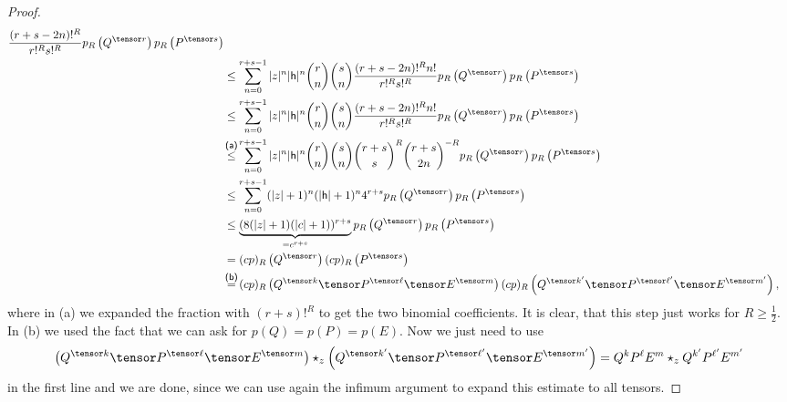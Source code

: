\begin{proof}
\begin{align*}
        \frac{(r + s - 2n)!^R}{r!^R s!^R}
        p_R \left(Q^{\tensor r} \right)
        p_R \left(P^{\tensor s} \right)
        \\
        & \leq
        \sum\limits_{n=0}^{r + s - 1}
        |z|^n |\mathsf{h}|^n
        \binom{r}{n} \binom{s}{n}
        \frac{(r + s - 2n)!^R n!}{r!^R s!^R}
        p_R \left(Q^{\tensor r} \right)
        p_R \left(P^{\tensor s} \right)
        \\
        & \leq
        \sum\limits_{n=0}^{r + s - 1}
        |z|^n |\mathsf{h}|^n
        \binom{r}{n} \binom{s}{n}
        \frac{(r + s - 2n)!^R n!}{r!^R s!^R}
        p_R \left(Q^{\tensor r} \right)
        p_R \left(P^{\tensor s} \right)
        \\
        & \ot{(a)}{\leq}
        \sum\limits_{n=0}^{r + s - 1}
        |z|^n |\mathsf{h}|^n
        \binom{r}{n} \binom{s}{n}
        \binom{r + s}{s}^R
        \binom{r + s}{2n}^{-R}
        p_R \left(Q^{\tensor r} \right)
        p_R \left(P^{\tensor s} \right)
        \\
        & \leq
        \sum\limits_{n=0}^{r + s - 1}
        (|z| + 1)^n (|\mathsf{h}| + 1)^n
        4^{r + s}
        p_R \left(Q^{\tensor r} \right)
        p_R \left(P^{\tensor s} \right)
        \\
        & \leq
        \underbrace{
        (8 (|z| + 1) (|c| + 1))^{r + s}
        }_{ = c^{r + s}}
        p_R \left(Q^{\tensor r} \right)
        p_R \left(P^{\tensor s} \right)
        \\
        & =
        (c p)_R \left(Q^{\tensor r} \right)
        (c p)_R \left(P^{\tensor s} \right)
        \\
        & \ot{(b)}{ = }
        (c p)_R \left(
        Q^{\tensor k} \tensor
        P^{\tensor \ell} \tensor
        E^{\tensor m} \right)
        (c p)_R \left(
        Q^{\tensor k'} \tensor
        P^{\tensor \ell'} \tensor
        E^{\tensor m'} \right),
    \end{align*}
    where in (a) we expanded the fraction with $(r + s)!^R$ to get the
    two binomial coefficients. It is clear, that this step just works
    for $R \geq \frac{1}{2}$.  In (b) we used the fact that we can ask
    for $p(Q) = p(P) = p(E)$. Now we just need to use
    \begin{equation*}
        \left(
        	Q^{\tensor k} \tensor
        	P^{\tensor \ell} \tensor
        	E^{\tensor m}
        \right)
        \ostar_z
        \left(
        	Q^{\tensor k'} \tensor
        	P^{\tensor \ell'} \tensor
        	E^{\tensor m'}
        \right)
        =
        Q^k P^{\ell} E^m
        \ostar_z
        Q^{k'} P^{\ell'} E^{m'}
    \end{equation*}
    in the first line and we are done, since we can use again the
    infimum argument to expand this estimate to all tensors.
\end{proof}
